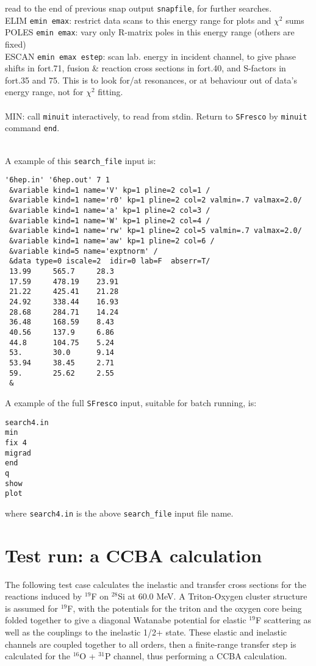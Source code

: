 \documentclass[11pt]{article}
\begin{document}
read to the end of previous snap output {\tt snapfile}, for further searches.
\\ ELIM {\tt emin emax}: restrict data scans to this energy range for plots and $\chi^2$ sums
\\ POLES {\tt emin emax}: vary only R-matrix poles in this energy range (others are fixed)
\\ ESCAN {\tt emin emax estep}: scan lab. energy in incident channel, to give
phase shifts in fort.71, fusion \& reaction cross sections in fort.40,
 and S-factors in fort.35 and 75.
This is to look for/at resonances, or at behaviour out of data's energy range,
not for $\chi^2$ fitting.\\
\\ MIN: call {\tt minuit} interactively, to read from stdin.
Return to {\tt SFresco} by {\tt minuit} command {\tt end}.


~\\
A example of this {\tt search\_file} input is:
\begin{verbatim}
'6hep.in' '6hep.out' 7 1
 &variable kind=1 name='V' kp=1 pline=2 col=1 /
 &variable kind=1 name='r0' kp=1 pline=2 col=2 valmin=.7 valmax=2.0/
 &variable kind=1 name='a' kp=1 pline=2 col=3 /
 &variable kind=1 name='W' kp=1 pline=2 col=4 /
 &variable kind=1 name='rw' kp=1 pline=2 col=5 valmin=.7 valmax=2.0/
 &variable kind=1 name='aw' kp=1 pline=2 col=6 /
 &variable kind=5 name='exptnorm' /
 &data type=0 iscale=2  idir=0 lab=F  abserr=T/
 13.99     565.7     28.3
 17.59     478.19    23.91
 21.22     425.41    21.28
 24.92     338.44    16.93
 28.68     284.71    14.24
 36.48     168.59    8.43
 40.56     137.9     6.86
 44.8      104.75    5.24
 53.       30.0      9.14
 53.94     38.45     2.71
 59.       25.62     2.55
 &
\end{verbatim}
\normalsize
A example of the full {\tt SFresco} input, suitable for batch running, is:
\begin{verbatim}
search4.in
min
fix 4
migrad
end
q
show
plot
\end{verbatim}
\normalsize
where {\tt search4.in} is the above {\tt search\_file} input file name.

\newpage
\section{Test run: a CCBA calculation}


The following test case calculates the inelastic and transfer cross sections
for the reactions induced by $^{19}$F on $^{28}$Si at 60.0 MeV.   A Triton-Oxygen
cluster structure is assumed for $^{19}$F, with the potentials for the triton
and the oxygen core being folded together to give a diagonal Watanabe
potential for elastic $^{19}$F scattering as well as the couplings to the
inelastic 1/2+ state.
These elastic and inelastic channels are coupled together to all orders,
then a finite-range transfer step is calculated for the $^{16}$O + $^{31}$P channel,
thus performing a CCBA calculation.
\end{document}
